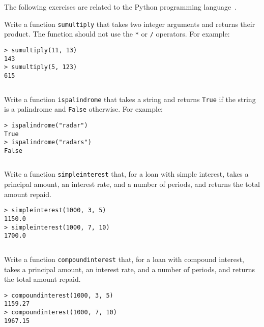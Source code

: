 \documentclass[a4paper, 12pt]{exam}
\begin{document}
\noindent
The following exercises are related to the Python programming language~\cite{pythonwebsite}.

\begin{questions}

\question
Write a function \texttt{sumultiply} that takes two integer arguments and returns their product.
The function should not use the \texttt{*} or \texttt{/} operators.
For example:
\begin{verbatim}
> sumultiply(11, 13)
143
> sumultiply(5, 123)
615
\end{verbatim}

\begin{solution}
  \inputminted{python}{solutions/sumultiply.py}
\end{solution}


\question
Write a function \texttt{ispalindrome} that takes a string and returns \texttt{True} if the string is a palindrome and \texttt{False} otherwise.
For example:
\begin{verbatim}
> ispalindrome("radar")
True
> ispalindrome("radars")
False
\end{verbatim}

\begin{solution}
  \inputminted{python}{solutions/ispalindrome.py}
\end{solution}


\question
Write a function \texttt{simpleinterest} that, for a loan with simple interest, takes a principal amount, an interest rate, and a number of periods, and returns the total amount repaid. 
\begin{verbatim}
> simpleinterest(1000, 3, 5)
1150.0
> simpleinterest(1000, 7, 10)
1700.0
\end{verbatim}

\begin{solution}
  \inputminted{python}{solutions/simpleinterest.py}
\end{solution}


\question
Write a function \texttt{compoundinterest} that, for a loan with compound interest, takes a principal amount, an interest rate, and a number of periods, and returns the total amount repaid. 
\begin{verbatim}
> compoundinterest(1000, 3, 5)
1159.27
> compoundinterest(1000, 7, 10)
1967.15
\end{verbatim}

\begin{solution}
  \inputminted{python}{solutions/compoundinterest.py}
\end{solution}



\end{questions}
\end{document}
